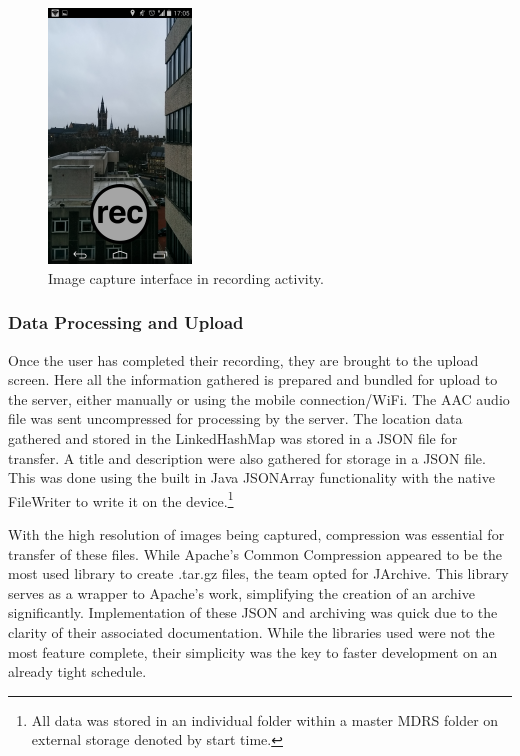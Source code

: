 \documentclass{l3proj}
\begin{document}
\begin{figure}[ht!]
\centering
\includegraphics[width=0.34\textwidth]{images/record-screen-final.png}
\caption{Image capture interface in recording activity.}
\end{figure}

\subsubsection {Data Processing and Upload}
Once the user has completed their recording, they are brought to the upload screen. Here all the information gathered is prepared and bundled for upload to the server, either manually or using the mobile connection/WiFi. The AAC audio file was sent uncompressed for processing by the server. The location data gathered and stored in the LinkedHashMap was stored in a JSON file for transfer. A title and description were also gathered for storage in a JSON file. This was done using the built in Java JSONArray functionality with the native FileWriter to write it on the device.\footnote{All data was stored in an individual folder within a master MDRS folder on external storage denoted by start time.}

With the high resolution of images being captured, compression was essential for transfer of these files. While Apache’s Common Compression appeared to be the most used library to create .tar.gz files, the team opted for JArchive\cite{jarchive}. This library serves as a wrapper to Apache’s work, simplifying the creation of an archive significantly. Implementation of these JSON and archiving was quick due to the clarity of their associated documentation. While the libraries used were not the most feature complete, their simplicity was the key to faster development on an already tight schedule.
\end{document}
